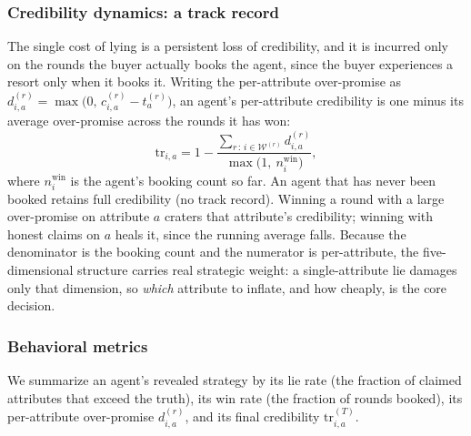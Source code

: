 \documentclass[conference]{IEEEtran}
\begin{document}
\subsubsection{Credibility dynamics: a track record}
The single cost of lying is a persistent loss of credibility, and it is incurred only on the rounds the buyer actually books the agent, since the buyer experiences a resort only when it books it. Writing the per-attribute over-promise as $d_{i,a}^{(r)} = \max\!\bigl(0,\, c_{i,a}^{(r)} - t_a^{(r)}\bigr)$, an agent's per-attribute credibility is one minus its average over-promise across the rounds it has won:
\begin{equation}
\mathrm{tr}_{i,a} = 1 - \frac{\sum_{r\,:\,i\in\mathcal{W}^{(r)}} d_{i,a}^{(r)}}{\max\!\bigl(1,\ n_i^{\mathrm{win}}\bigr)},
\label{eq:dec5-trust}
\end{equation}
where $n_i^{\mathrm{win}}$ is the agent's booking count so far. An agent that has never been booked retains full credibility (no track record). Winning a round with a large over-promise on attribute $a$ craters that attribute's credibility; winning with honest claims on $a$ heals it, since the running average falls. Because the denominator is the booking count and the numerator is per-attribute, the five-dimensional structure carries real strategic weight: a single-attribute lie damages only that dimension, so \emph{which} attribute to inflate, and how cheaply, is the core decision.

\subsubsection{Behavioral metrics}
We summarize an agent's revealed strategy by its lie rate (the fraction of claimed attributes that exceed the truth), its win rate (the fraction of rounds booked), its per-attribute over-promise $d_{i,a}^{(r)}$, and its final credibility $\mathrm{tr}_{i,a}^{(T)}$.
\end{document}
